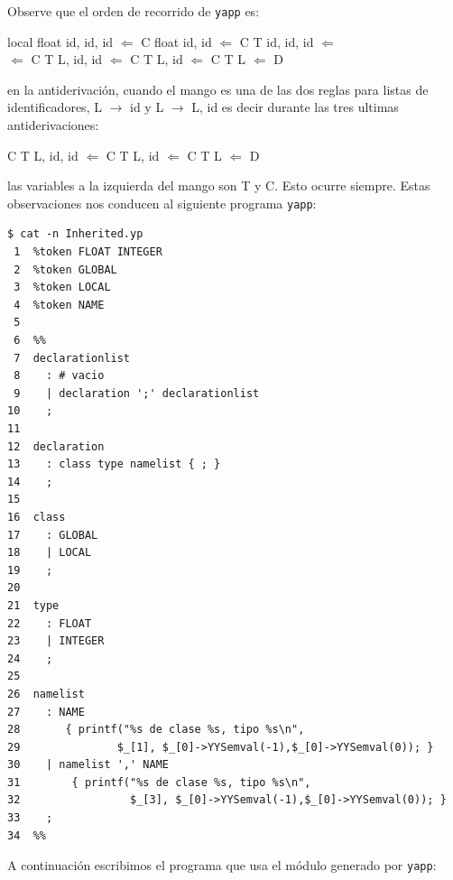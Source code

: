 \noindent Observe que el orden de recorrido de \verb|yapp| es:
\begin{center}
local float id, id, id $\Longleftarrow$ C float id, id $\Longleftarrow$
C T id, id, id $\Longleftarrow$\\
$\Longleftarrow$ C T L, id, id $\Longleftarrow$ C T L, id $\Longleftarrow$ C T L $\Longleftarrow$ D
\end{center}

\noindent en la antiderivación, cuando el mango es una de las dos reglas 
para listas de identificadores, L $\rightarrow$ id y L $\rightarrow$ L, id 
es decir durante las tres ultimas antiderivaciones:

\begin{center}
C T L, id, id $\Longleftarrow$ C T L, id $\Longleftarrow$ C T L $\Longleftarrow$ D
\end{center}

\noindent las variables a la izquierda del mango son
T y C. Esto ocurre siempre. 
Estas observaciones nos conducen al siguiente
programa \verb|yapp|: 

\begin{verbatim}
$ cat -n Inherited.yp
 1  %token FLOAT INTEGER
 2  %token GLOBAL
 3  %token LOCAL
 4  %token NAME
 5
 6  %%
 7  declarationlist
 8    : # vacio
 9    | declaration ';' declarationlist
10    ;
11
12  declaration
13    : class type namelist { ; }
14    ;
15
16  class
17    : GLOBAL
18    | LOCAL
19    ;
20
21  type
22    : FLOAT
23    | INTEGER
24    ;
25
26  namelist
27    : NAME
28       { printf("%s de clase %s, tipo %s\n",
29               $_[1], $_[0]->YYSemval(-1),$_[0]->YYSemval(0)); }
30    | namelist ',' NAME
31        { printf("%s de clase %s, tipo %s\n",
32                 $_[3], $_[0]->YYSemval(-1),$_[0]->YYSemval(0)); }
33    ;
34  %%
\end{verbatim}

A continuación escribimos el programa que usa 
el módulo generado por \verb|yapp|:

